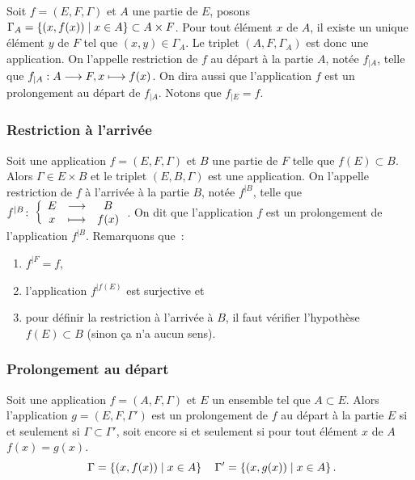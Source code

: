 Soit \(f = (E, F, \Gamma)\) et \(A\) une partie de \(E\), posons 
\(\Gamma_A = \left\{(x, f(x))\mathrel{}\middle|\mathrel{}x \in A\right\} \subset A \times F\). Pour tout élément 
\(x\) de \(A\), il existe un unique élément \(y\) de \(F\) tel que \((x, y) \in 
\Gamma_A\). Le triplet \((A, F, \Gamma_A)\) est donc une application. On 
l'appelle restriction de \(f\) au départ à la partie \(A\), notée \(f_{|A}\), 
telle que \(f_{|A}:A \longrightarrow F, x \longmapsto f(x)\). On dira aussi que l'application 
\(f\) est un prolongement au départ de \(f_{|A}\). Notons que \(f_{|E} = f\).

\subsubsection{Restriction à l'arrivée}
\label{chap3-subsubsec:restrictionarr}

Soit une application \(f = (E, F, \Gamma)\) et \(B\) une partie de \(F\) telle 
que \(f(E) \subset B\). Alors \(\Gamma \in E \times B\) et le triplet 
\((E, B, \Gamma)\) est une application. On l'appelle restriction de \(f\) à 
l'arrivée à la partie \(B\), notée \(f^{|B}\), telle que 
\(f^{|B}\colon \left\{\begin{array}{ccc} E & \longrightarrow &B\\ x & \longmapsto & f(x) \end{array} \right.\). On dit que l'application \(f\) est un 
prolongement de l'application \(f^{|B}\). Remarquons que~:
\begin{enumerate}
  \item \(f^{|F} = f\), 
  \item l'application \(f^{|f(E)}\) est surjective et 
  \item pour définir la restriction à l'arrivée à \(B\), il faut vérifier 
    l'hypothèse \(f(E) \subset B\) (sinon ça n'a aucun sens).
\end{enumerate}

\subsubsection{Prolongement au départ}
\label{chap3-subsubsec:prolongementdep}

Soit une application \(f = (A, F, \Gamma)\) et \(E\) un ensemble tel que \(A \subset 
E\). Alors l'application \(g = (E, F, \Gamma')\) est un prolongement de \(f\) au 
départ à la partie \(E\) si et seulement si \(\Gamma \subset \Gamma'\), soit 
encore si et seulement si pour tout élément \(x\) de \(A\) \(f(x) = g(x)\).
\begin{equation}\
  \Gamma = \left\{(x,f(x))\mathrel{}\middle|\mathrel{}x \in A\right\} \quad \Gamma' = \left\{(x,g(x))\mathrel{}\middle|\mathrel{}x \in A\right\}.
\end{equation}


